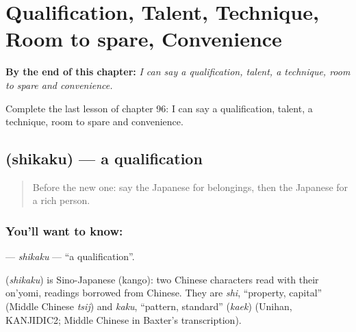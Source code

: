 
\chapter{Qualification, Talent, Technique, Room to spare, Convenience}
\label{ch:ja-qualification-talent-technique-room-to-spare-convenience}

\begin{chapteropening}
\textbf{By the end of this chapter:} \emph{I can say a qualification, talent, a technique, room to spare and convenience.}

Complete the last lesson of chapter 96: I can say a qualification, talent, a technique, room to spare and convenience.
\end{chapteropening}

\section[\texorpdfstring{\ja{しかく} (shikaku)}{しかく (shikaku)}]{ (shikaku) — a qualification}

\label{lesson:JA-C96-shikaku}



\begin{quote}
Before the new one: say the Japanese for belongings, then the Japanese for a rich person.
\end{quote}

\subsection*{You'll want to know: }
\textbf{} — \emph{shikaku} — \textquotedblleft{}a qualification\textquotedblright{}.

\begin{cousinweb}
\textbf{} (\emph{shikaku}) is Sino-Japanese (kango): two Chinese characters read with their on'yomi, readings borrowed from Chinese. They are \emph{shi}, \textquotedblleft{}property, capital\textquotedblright{} (Middle Chinese \emph{tsij}) and \emph{kaku}, \textquotedblleft{}pattern, standard\textquotedblright{} (\emph{kaek}) (Unihan, KANJIDIC2; Middle Chinese in Baxter's transcription).
\end{cousinweb}

